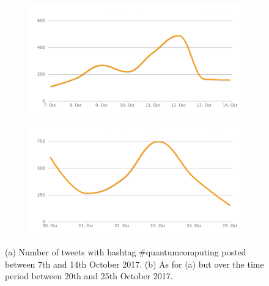 \begin{figure}
 \centering
 \begin{subfigure}[b]{0.9\textwidth}
   \includegraphics[width=1\linewidth]{Images/FirstSearch_QuantumComputing.png}
   \caption{} 
 \end{subfigure}

 \begin{subfigure}[b]{0.9\textwidth}
   \includegraphics[width=1\linewidth]{Images/SecondSearch_QuantumComputing.png}
   \caption{}
 \end{subfigure}
 \caption{(a) Number of tweets with hashtag \#quantumcomputing posted between 7th and 14th October 2017. (b) As for (a) but over the time period between 20th and 25th October 2017.} 
 \label{First-SecondSearch_QuantumComputing}
\end{figure}

